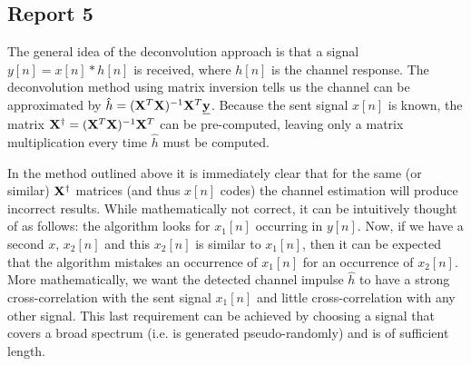 \documentclass[11pt,titlepage]{report}
\begin{document}
\subsection{Report 5}
\label{subsec:ass2-report5}
The general idea of the deconvolution approach is that a signal $y[n]=x[n]*h[n]$ is received, where $h[n]$ is the channel response. The deconvolution method using matrix inversion tells us the channel can be approximated by $\hat{h}=(\mathbf{X}^T\mathbf{X})^{-1}\mathbf{X}^T\mathbf{\underline{y}}$. Because the sent signal $x[n]$ is known, the matrix $\mathbf{X}^\dagger=(\mathbf{X}^T\mathbf{X})^{-1}\mathbf{X}^T$ can be pre-computed, leaving only a matrix multiplication every time $\hat{h}$ must be computed. 

In the method outlined above it is immediately clear that for the same (or similar) $\mathbf{X}^\dagger$ matrices (and thus $x[n]$ codes) the channel estimation will produce incorrect results. While mathematically not correct, it can be intuitively thought of as follows: the algorithm looks for $x_1[n]$ occurring in $y[n]$. Now, if we have a second $x$, $x_2[n]$ and this $x_2[n]$ is similar to $x_1[n]$, then it can be expected that the algorithm mistakes an occurrence of $x_1[n]$ for an occurrence of $x_2[n]$. More mathematically, we want the detected channel impulse $\hat{h}$ to have a strong cross-correlation with the sent signal $x_1[n]$ and little cross-correlation with any other signal. This last requirement can be achieved by choosing a signal that covers a broad spectrum (i.e. is generated pseudo-randomly) and is of sufficient length.
\end{document}
